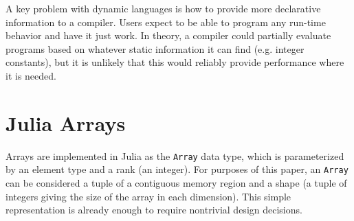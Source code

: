 \documentclass[preprint]{sigplanconf}
\newcommand{\code}[1]{\texttt{#1}}
\begin{document}
A key problem with dynamic languages is how to provide more declarative
information to a compiler. Users expect to be able to program any
run-time behavior and have it just work. In theory, a compiler could
partially evaluate programs based on whatever static information it can
find (e.g. integer constants), but it is unlikely that this would reliably
provide performance where it is needed.



\section{Julia Arrays}

Arrays are implemented in Julia\cite{Bezanson:2012jf} as the \code{Array}
data type, which is parameterized by an element type and a rank (an integer).
For purposes of this paper, an \code{Array} can be considered a tuple of
a contiguous memory region and a shape (a tuple of integers giving the size
of the array in each dimension). This simple representation is already
enough to require nontrivial design decisions.

\end{document}
